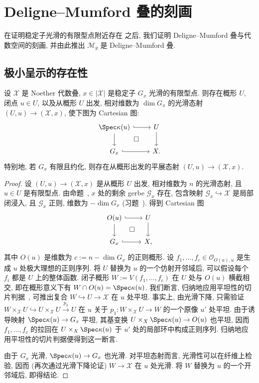 \section{Deligne--Mumford 叠的刻画}\label{src:4.6-section}
在证明稳定子光滑的有限型点附近存在 之后, 我们证明 Deligne--Mumford 叠与代数空间的刻画, 并由此推出 $\mathcal M_g$ 是 Deligne--Mumford 叠.
\subsection{极小呈示的存在性}\label{src:4.6.1-subsection}
\begin{theorem}[极小呈示的存在性]\label{src:4.6.1}
设 $\mathcal X$ 是 Noether 代数叠, $x\in|\mathcal X|$ 是稳定子 $G_x$ 光滑的有限型点. 则存在概形 $U$, 闭点 $u\in U$, 以及从概形 $U$ 出发, 相对维数为 $\dim G_x$ 的光滑态射 $(U,u)\to(\mathcal X,x)$, 使下图为 Cartesian 图:
\[
\begin{tikzcd}
\Spec\kappa(u)\arrow[r,hook]\arrow[d]&U\arrow[d]\\
\mathcal G_x\arrow[r,hook]\arrow[ur,phantom,"\square" description]&\mathcal X.
\end{tikzcd}
\]
特别地, 若 $G_x$ 有限且约化, 则存在从概形出发的平展态射 $(U,u)\to(\mathcal X,x)$.
\end{theorem}
\begin{proof}
设 $(U,u)\to(\mathcal X,x)$ 是从概形 $U$ 出发, 相对维数为 $n$ 的光滑态射, 且 $u\in U$ 是有限型点. 由命题~, $x$ 处的剩余 gerbe $\mathcal G_x$ 存在, 包含映射 $\mathcal G_x\hookrightarrow\mathcal X$ 是局部闭浸入, 且 $\mathcal G_x$ 正则, 维数为 $-\dim G_x$ (习题~). 得到 Cartesian 图
\[
\begin{tikzcd}
O(u)\arrow[r,hook]\arrow[d]&U\arrow[d]\\
\mathcal G_x\arrow[r,hook]\arrow[ur,phantom,"\square" description]&\mathcal X,
\end{tikzcd}
\]
其中 $O(u)$ 是维数为 $c:=n-\dim G_x$ 的正则概形. 设 $f_1,\ldots,f_c\in\mathcal O_{O(u),u}$ 是生成 $u$ 处极大理想的正则序列. 将 $U$ 替换为 $u$ 的一个仿射开邻域后, 可以假设每个 $f_i$ 都是 $U$ 上的整体函数. 闭子概形 $W:=V(f_1,\ldots,f_c)$ 在 $U$ 处与 $O(u)$ 横截相交, 即在概形意义下有 $W\cap O(u)=\Spec\kappa(u)$. 我们断言, 归纳地应用平坦性的切片判据~, 可推出复合 $W\hookrightarrow U\to\mathcal X$ 在 $u$ 处平坦. 事实上, 由光滑下降, 只需验证 $W\times_{\mathcal X}U\hookrightarrow U\times_{\mathcal X}U\xrightarrow{p_2}U$ 在 $u$ 关于 $p_1:W\times_{\mathcal X}U\to W$ 的一个原像 $u'$ 处平坦. 由于诱导映射 $\Spec\kappa(u)\to\mathcal G_x$ 平坦, 其基变换 $U\times_{\mathcal X}\Spec\kappa(u)\to O(u)$ 也平坦, 因而 $f_1,\ldots,f_c$ 的拉回在 $U\times_{\mathcal X}\Spec\kappa(u)$ 于 $u'$ 处的局部环中构成正则序列. 归纳地应用平坦性的切片判据便得到这一断言.

由于 $G_x$ 光滑, $\Spec\kappa(u)\to\mathcal G_x$ 也光滑. 对平坦态射而言, 光滑性可以在纤维上检验, 因而 (再次通过光滑下降论证) $W\to\mathcal X$ 在 $u$ 处光滑. 将 $W$ 替换为 $u$ 的一个开邻域后, 即得结论.
\end{proof}
